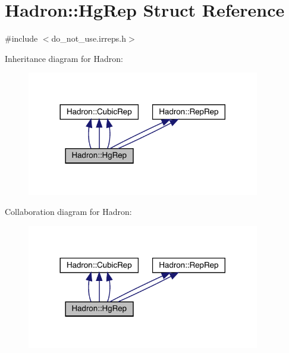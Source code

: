 \hypertarget{structHadron_1_1HgRep}{}\section{Hadron\+:\+:Hg\+Rep Struct Reference}
\label{structHadron_1_1HgRep}


{\ttfamily \#include $<$do\+\_\+not\+\_\+use.\+irreps.\+h$>$}



Inheritance diagram for Hadron\+:
\nopagebreak
\begin{figure}[H]
\begin{center}
\leavevmode
\includegraphics[width=288pt]{d1/d06/structHadron_1_1HgRep__inherit__graph}
\end{center}
\end{figure}


Collaboration diagram for Hadron\+:
\nopagebreak
\begin{figure}[H]
\begin{center}
\leavevmode
\includegraphics[width=288pt]{d6/d9d/structHadron_1_1HgRep__coll__graph}
\end{center}
\end{figure}
